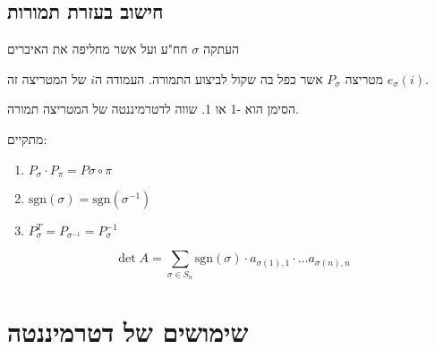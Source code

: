 \documentclass{tstextbook}
\begin{document}
\subsection{חישוב בעזרת תמורות}

\begin{definition}[תמורה]
העתקה \(\sigma\) חח"ע ועל אשר מחליפה את האיברים

\end{definition}
\begin{definition}
מטריצה \(P_\sigma\) אשר כפל בה שקול לביצוע התמורה. העמודה ה\(i\) של המטריצה זה \(e_\sigma(i)\).

\end{definition}
\begin{definition}
הסימן הוא -1 או 1. שווה לדטרמיננטה של המטריצה תמורה.

\end{definition}
\begin{proposition}
מתקיים:

  \begin{enumerate}
    \item \(P_\sigma \cdot P_\pi = P\sigma \circ \pi\)


    \item \(\text{sgn}(\sigma) = \text{sgn}(\sigma^{-1})\)


    \item \(P_\sigma ^T = P_{\sigma^{-1}} = P_\sigma ^{-1}\)


  \end{enumerate}
\end{proposition}
\begin{proposition}
$$\det A = \sum_{\sigma\in S_n} \text{sgn}(\sigma) \cdot a_{\sigma(1),1}\cdot \dots a_{\sigma(n),n} $$

\end{proposition}
\section{שימושים של דטרמיננטה}
\end{document}
